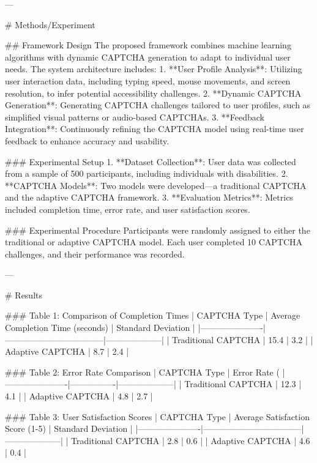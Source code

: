 ---

# Methods/Experiment  

## Framework Design  
The proposed framework combines machine learning algorithms with dynamic CAPTCHA generation to adapt to individual user needs. The system architecture includes:  
1. **User Profile Analysis**: Utilizing user interaction data, including typing speed, mouse movements, and screen resolution, to infer potential accessibility challenges.  
2. **Dynamic CAPTCHA Generation**: Generating CAPTCHA challenges tailored to user profiles, such as simplified visual patterns or audio-based CAPTCHAs.  
3. **Feedback Integration**: Continuously refining the CAPTCHA model using real-time user feedback to enhance accuracy and usability.

### Experimental Setup  
1. **Dataset Collection**: User data was collected from a sample of 500 participants, including individuals with disabilities.  
2. **CAPTCHA Models**: Two models were developed—a traditional CAPTCHA and the adaptive CAPTCHA framework.  
3. **Evaluation Metrics**: Metrics included completion time, error rate, and user satisfaction scores.

### Experimental Procedure  
Participants were randomly assigned to either the traditional or adaptive CAPTCHA model. Each user completed 10 CAPTCHA challenges, and their performance was recorded.

---

# Results  

### Table 1: Comparison of Completion Times  
| CAPTCHA Type         | Average Completion Time (seconds) | Standard Deviation |
|----------------------|-----------------------------------|--------------------|
| Traditional CAPTCHA | 15.4                             | 3.2                |
| Adaptive CAPTCHA    | 8.7                              | 2.4                |

### Table 2: Error Rate Comparison  
| CAPTCHA Type         | Error Rate (%
|----------------------|----------------|--------------------|
| Traditional CAPTCHA | 12.3           | 4.1                |
| Adaptive CAPTCHA    | 4.8            | 2.7                |

### Table 3: User Satisfaction Scores  
| CAPTCHA Type         | Average Satisfaction Score (1-5) | Standard Deviation |
|----------------------|-----------------------------------|--------------------|
| Traditional CAPTCHA | 2.8                              | 0.6                |
| Adaptive CAPTCHA    | 4.6                              | 0.4                |

